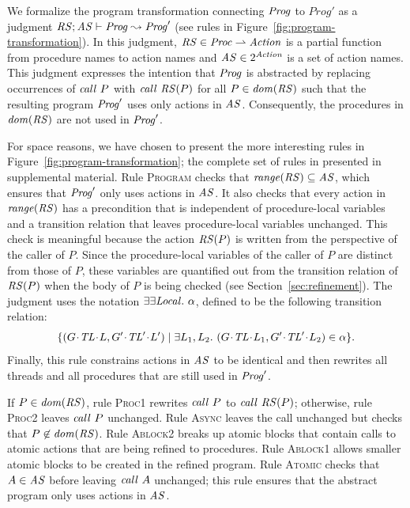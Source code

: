 We formalize the program transformation connecting $\mathit{Prog}$ to $Prog'$ as a judgment
$\mathit{RS};\mathit{AS} \vdash \mathit{Prog} \leadsto \mathit{Prog}'$ (see rules in Figure~\ref{fig:program-transformation}).
In this judgment,
$\mathit{RS} \in \mathit{Proc} \rightharpoonup \mathit{Action}$ is a partial function from procedure names to action names
and $\mathit{AS} \in 2^{\mathit{Action}}$ is a set of action names.
This judgment expresses the intention that $\mathit{Prog}$ is abstracted by replacing
occurrences of $\mathit{call}\ P$ with $\mathit{call}\ \mathit{RS}(P)$ for all $P \in \mathit{dom}(\mathit{RS})$ such that 
the resulting program $\mathit{Prog}'$ uses only actions in $\mathit{AS}$.
Consequently, the procedures in $\mathit{dom}(\mathit{RS})$ are not used in $\mathit{Prog}'$.

For space reasons, we have chosen to present the more interesting rules in Figure~\ref{fig:program-transformation};
the complete set of rules in presented in supplemental material.
Rule \textsc{Program} checks that $\mathit{range}(\mathit{RS}) \subseteq \mathit{AS}$,
which ensures that $\mathit{Prog}'$ only uses actions in $\mathit{AS}$.
It also checks that every action in $\mathit{range}(\mathit{RS})$ has a precondition 
that is independent of procedure-local variables and a transition relation that leaves 
procedure-local variables unchanged.  
This check is meaningful because the action $\mathit{RS}(P)$ is written from the 
perspective of the caller of $P$.
Since the procedure-local variables of the caller of $P$ are distinct from those of $P$,
these variables are quantified out from the transition relation of $\mathit{RS}(P)$ when 
the body of $P$ is being checked (see Section~\ref{sec:refinement}).
The judgment uses the notation $\exists\exists {\mathit{Local}}.\ \alpha$, defined to be the following transition relation:
\[\{(\MakeStore{\varsG}{\varsTL}{\varsL}, \MakeStore{\varsG'}{\varsTL'}{\varsL'}) \mid \exists \varsL_1,\varsL_2.\ (\MakeStore{\varsG}{\varsTL}{\varsL_1}, \MakeStore{\varsG'}{\varsTL'}{\varsL_2}) \in \alpha \}.\]
Finally, this rule constrains actions in $\mathit{AS}$ to be identical and then rewrites all threads
and all procedures that are still used in $\mathit{Prog}'$.

If $P \in \mathit{dom}(\mathit{RS})$, rule \textsc{Proc1} rewrites $\mathit{call}\ P$ to $\mathit{call}\ \mathit{RS}(P)$;
otherwise, rule \textsc{Proc2} leaves $\mathit{call}\ P$ unchanged.
Rule \textsc{Async} leaves the call unchanged but checks that $P \not \in \mathit{dom}(\mathit{RS})$.
Rule \textsc{Ablock2} breaks up atomic blocks that contain calls
to atomic actions that are being refined to procedures.
Rule \textsc{Ablock1} allows smaller atomic blocks to be created in the refined program.
Rule \textsc{Atomic} checks that $A \in \mathit{AS}$ before leaving $\mathit{call}\ A$ unchanged;
this rule ensures that the abstract program only uses actions in $\mathit{AS}$.

